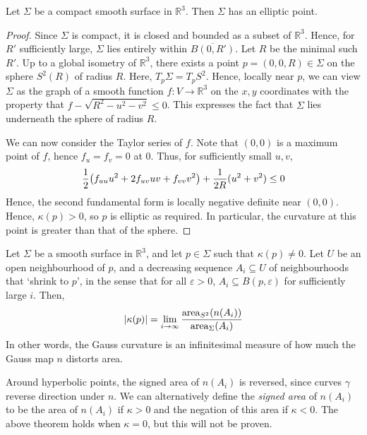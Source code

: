 \begin{proposition}
	Let \( \Sigma \) be a compact smooth surface in \( \mathbb R^3 \).
	Then \( \Sigma \) has an elliptic point.
\end{proposition}
\begin{proof}
	Since \( \Sigma \) is compact, it is closed and bounded as a subset of \( \mathbb R^3 \).
	Hence, for \( R' \) sufficiently large, \( \Sigma \) lies entirely within \( \overline{B(0,R')} \).
	Let \( R \) be the minimal such \( R' \).
	Up to a global isometry of \( \mathbb R^3 \), there exists a point \( p = (0,0,R) \in \Sigma \) on the sphere \( S^2(R) \) of radius \( R \).
	Here, \( T_p \Sigma = T_p S^2 \).
	Hence, locally near \( p \), we can view \( \Sigma \) as the graph of a smooth function \( f \colon V \to \mathbb R^3 \) on the \( x, y \) coordinates with the property that \( f - \sqrt{R^2 - u^2 - v^2} \leq 0 \).
	This expresses the fact that \( \Sigma \) lies underneath the sphere of radius \( R \).

	We can now consider the Taylor series of \( f \).
	Note that \( (0,0) \) is a maximum point of \( f \), hence \( f_u = f_v = 0 \) at \( 0 \).
	Thus, for sufficiently small \( u,v \),
	\[ \frac{1}{2} \qty(f_{uu} u^2 + 2f_{uv} uv + f_{vv} v^2) + \frac{1}{2R} (u^2 + v^2) \leq 0 \]
	Hence, the second fundamental form is locally negative definite near \( (0,0) \).
	Hence, \( \kappa(p) > 0 \), so \( p \) is elliptic as required.
	In particular, the curvature at this point is greater than that of the sphere.
\end{proof}
\begin{theorem}
	Let \( \Sigma \) be a smooth surface in \( \mathbb R^3 \), and let \( p \in \Sigma \) such that \( \kappa(p) \neq 0 \).
	Let \( U \) be an open neighbourhood of \( p \), and a decreasing sequence \( A_i \subseteq U \) of neighbourhoods that `shrink to \( p \)', in the sense that for all \( \varepsilon > 0 \), \( A_i \subseteq B(p,\varepsilon) \) for sufficiently large \( i \).
	Then,
	\[ \abs{\kappa(p)} = \lim_{i \to \infty} \frac{\mathrm{area}_{S^2} (n(A_i))}{\mathrm{area}_{\Sigma} (A_i)} \]
	In other words, the Gauss curvature is an infinitesimal measure of how much the Gauss map \( n \) distorts area.
\end{theorem}
\begin{remark}
	Around hyperbolic points, the signed area of \( n(A_i) \) is reversed, since curves \( \gamma \) reverse direction under \( n \).
	We can alternatively define the \textit{signed area} of \( n(A_i) \) to be the area of \( n(A_i) \) if \( \kappa > 0 \) and the negation of this area if \( \kappa < 0 \).
	The above theorem holds when \( \kappa = 0 \), but this will not be proven.
\end{remark}
